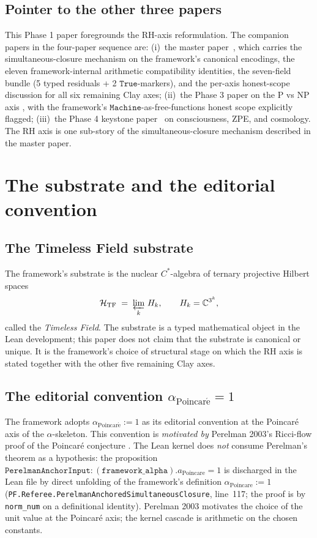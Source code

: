 \documentclass[11pt,a4paper]{article}
\theoremstyle{plain}
\theoremstyle{definition}
\begin{document}
\subsection{Pointer to the other three papers}
\label{sec:pointer}

This Phase 1 paper foregrounds the RH-axis reformulation. The
companion papers in the four-paper sequence are:
(i)~the master paper~\cite{master_substrate}, which carries the
simultaneous-closure mechanism on the framework's canonical
encodings, the eleven framework-internal arithmetic compatibility
identities, the seven-field bundle (5 typed residuals + 2
$\mathtt{True}$-markers), and the per-axis honest-scope discussion
for all six remaining Clay axes; (ii)~the Phase 3 paper on the P vs
NP axis \cite{phase3_pnp}, with the framework's
$\mathtt{Machine}$-as-free-functions honest scope explicitly flagged;
(iii)~the Phase 4 keystone paper~\cite{phase4_keystone} on
consciousness, ZPE, and cosmology. The RH axis is one sub-story of
the simultaneous-closure mechanism described in the master paper.

\section{The substrate and the editorial convention}
\label{sec:substrate}

\subsection{The Timeless Field substrate}
\label{sec:tf}

The framework's substrate is the nuclear $C^{*}$-algebra of ternary
projective Hilbert spaces
\[
\mathcal{H}_{\mathrm{TF}} \;=\; \varprojlim_{k}\, H_{k},
\qquad H_{k} = \mathbb{C}^{3^{k}},
\]
called the \emph{Timeless Field}. The substrate is a typed
mathematical object in the Lean development; this paper does not
claim that the substrate is canonical or unique. It is the
framework's choice of structural stage on which the RH axis is
stated together with the other five remaining Clay axes.

\subsection{The editorial convention $\alpha_{\mathrm{Poincar\acute e}} = 1$}
\label{sec:editorial-convention}

The framework adopts $\alpha_{\mathrm{Poincar\acute e}} := 1$ as its
editorial convention at the Poincar\'e axis of the $\alpha$-skeleton.
This convention is \emph{motivated by} Perelman 2003's Ricci-flow
proof of the Poincar\'e conjecture \cite{perelman2002,perelman2003a,%
perelman2003b}. The Lean kernel does \emph{not} consume Perelman's
theorem as a hypothesis: the proposition
$\mathtt{PerelmanAnchorInput} :
(\mathtt{framework\_alpha}).a_{\mathrm{Poincare}} = 1$ is discharged
in the Lean file by direct unfolding of the framework's definition
$\alpha_{\mathrm{Poincare}} := 1$
(\texttt{PF.Referee.PerelmanAnchoredSimultaneousClosure}, line~117;
the proof is by \texttt{norm\_num} on a definitional identity).
Perelman 2003 motivates the choice of the unit value at the
Poincar\'e axis; the kernel cascade is arithmetic on the chosen
constants.
\end{document}
